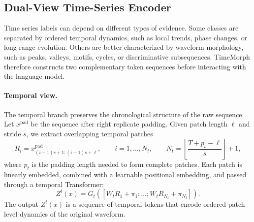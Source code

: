 \documentclass{article}
\begin{document}
\subsection{Dual-View Time-Series Encoder}
\label{sec:dual-view-encoder}

Time series labels can depend on different types of evidence. Some classes are
separated by ordered temporal dynamics, such as local trends, phase changes, or
long-range evolution. Others are better characterized by waveform morphology,
such as peaks, valleys, motifs, cycles, or discriminative subsequences. TimeMorph
therefore constructs two complementary token sequences before interacting with
the language model.

\paragraph{Temporal view.}
The temporal branch preserves the chronological structure of the raw sequence.
Let $x^{\mathrm{pad}}$ be the sequence after right replicate padding. Given patch
length $\ell$ and stride $s$, we extract overlapping temporal patches
\begin{equation}
\label{eq:temporal-patches}
R_i=x^{\mathrm{pad}}_{(i-1)s+1:(i-1)s+\ell},
\qquad
 i=1,\ldots,N_t,
\qquad
N_t=\left\lfloor\frac{T+p_t-\ell}{s}\right\rfloor+1,
\end{equation}
where $p_t$ is the padding length needed to form complete patches. Each patch is
linearly embedded, combined with a learnable positional embedding, and passed
through a temporal Transformer:
\begin{equation}
\label{eq:temporal-encoder}
Z^{t}(x)
=
G_t
\left(
\left[
W_tR_1+\pi_1;
\ldots;
W_tR_{N_t}+\pi_{N_t}
\right]
\right).
\end{equation}
The output $Z^t(x)$ is a sequence of temporal tokens that encode ordered
patch-level dynamics of the original waveform.
\end{document}
